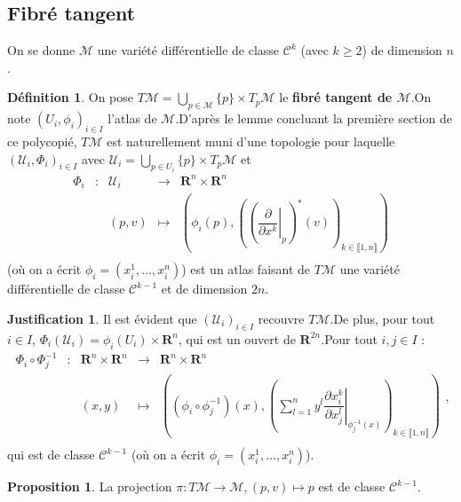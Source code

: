 \documentclass[12pt,a4paper]{article}
\theoremstyle{definition}
\newtheorem{prop}[thm]{Proposition}
\newtheorem{defn}[thm]{Définition}
\newtheorem*{just}{Justification}
\begin{document}
\subsection{Fibré tangent}
On se donne $\mathcal{M}$ une variété différentielle de classe $\mathcal{C}^k$ (avec $k\geqslant 2$) de dimension $n$.
\begin{defn}
On pose $\displaystyle T\mathcal{M}=\bigcup_{p\in\mathcal{M}}\{p\}\times T_p\mathcal{M}$ le \textbf{fibré tangent de $\mathcal{M}$}.\newline On note $(U_i,\phi_i)_{i\in I}$ l'atlas de $\mathcal{M}$.\newline D'après le lemme concluant la première section de ce polycopié, $T\mathcal{M}$ est naturellement muni d'une topologie pour laquelle $(\mathcal{U}_i,\Phi_i)_{i\in I}$ avec $\mathcal{U}_i=\displaystyle\bigcup_{p\in U_i}\{p\}\times T_p\mathcal{M}$ et $$\begin{array}{ccccc}
\Phi_i & : & \mathcal{U}_i & \to & \mathbf{R}^{n}\times\mathbf{R}^n \\
 & & (p,v) & \mapsto & \left(\phi_i(p),\left(\left(\left.\dfrac{\partial}{\partial x^k}\right|_p\right)^*(v)\right)_{k\in\llbracket 1,n\rrbracket}\right) \\
\end{array}$$
(où on a écrit $\phi_i=(x_i^1,\ldots,x_i^n)$) est un atlas faisant de $T\mathcal{M}$ une variété différentielle de classe $\mathcal{C}^{k-1}$ et de dimension $2n$.
\end{defn}
\begin{just}
Il est évident que $(\mathcal{U}_i)_{i\in I}$ recouvre $T\mathcal{M}$.\newline De plus, pour tout $i\in I$, $\Phi_i(\mathcal{U}_i)=\phi_i(U_i)\times\mathbf{R}^n$, qui est un ouvert de $\mathbf{R}^{2n}$.\newline Pour tout $i,j\in I$ :
$$\begin{array}{ccccc}
\Phi_i\circ\Phi_j^{-1} & : & \mathbf{R}^n\times\mathbf{R}^n & \to & \mathbf{R}^n\times\mathbf{R}^n \\
 & & (x,y) & \mapsto & \left(\left(\phi_i\circ\phi_j^{-1}\right)(x),\left(\displaystyle\sum\limits_{l=1}^ny^l\left.\dfrac{\partial x_i^k}{\partial x_j^l}\right|_{\phi_j^{-1}(x)}\right)_{k\in\llbracket 1,n\rrbracket}\right) \\
\end{array},$$
qui est de classe $\mathcal{C}^{k-1}$ (où on a écrit $\phi_i=(x_i^1,\ldots,x_i^n)$).
\end{just}
\begin{prop}
La projection $\pi: T\mathcal{M}\to\mathcal{M},(p,v)\mapsto p$ est de classe $\mathcal{C}^{k-1}$.
\end{prop}
\end{document}
